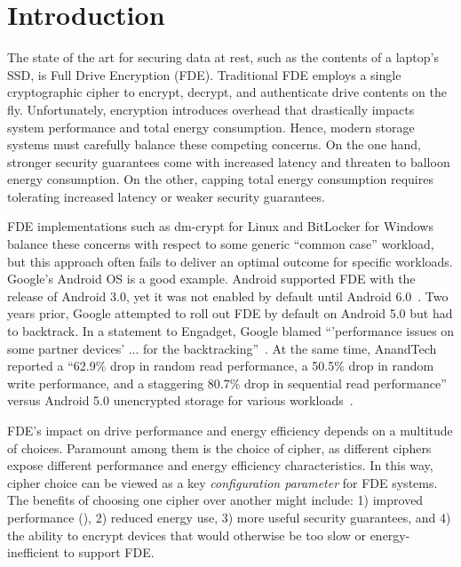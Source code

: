 \section{Introduction} \label{sec:introduction}

The state of the art for securing data at rest, such as the contents of a
laptop's SSD, is Full Drive Encryption (FDE). Traditional FDE employs a single
cryptographic cipher to encrypt, decrypt, and authenticate drive contents on the
fly. Unfortunately, encryption introduces overhead that drastically impacts
system performance and total energy consumption. Hence, modern storage systems
must carefully balance these competing concerns. On the one hand, stronger
security guarantees come with increased latency and threaten to balloon energy
consumption. On the other, capping total energy consumption requires tolerating
increased latency or weaker security guarantees.

FDE implementations such as dm-crypt for Linux and BitLocker for Windows balance
these concerns with respect to some generic ``common case'' workload, but this
approach often fails to deliver an optimal outcome for specific workloads. 
Google's Android OS is a good example. Android supported FDE with the release of
Android 3.0, yet it was not enabled by default until Android
6.0~\cite{android-M-mobile-motivation}. Two years prior, Google attempted to
roll out FDE by default on Android 5.0 but had to backtrack. In a statement to
Engadget, Google blamed ``'performance issues on some partner devices' ... for
the backtracking''~\cite{google-engadget}. At the same time, AnandTech reported
a ``62.9\% drop in random read performance, a 50.5\% drop in random write
performance, and a staggering 80.7\% drop in sequential read performance''
versus Android 5.0 unencrypted storage for various
workloads~\cite{android-M-mobile-motivation-2}.

FDE's impact on drive performance and energy efficiency depends on a multitude
of choices. Paramount among them is the choice of cipher, as different ciphers
expose different performance and energy efficiency characteristics. In this way,
cipher choice can be viewed as a key \emph{configuration parameter} for FDE
systems. The benefits of choosing one cipher over another might include: 1)
improved performance (), 2) reduced energy
use, 3) more useful security guarantees, and 4) the ability to encrypt devices
that would otherwise be too slow or energy-inefficient to support FDE.

